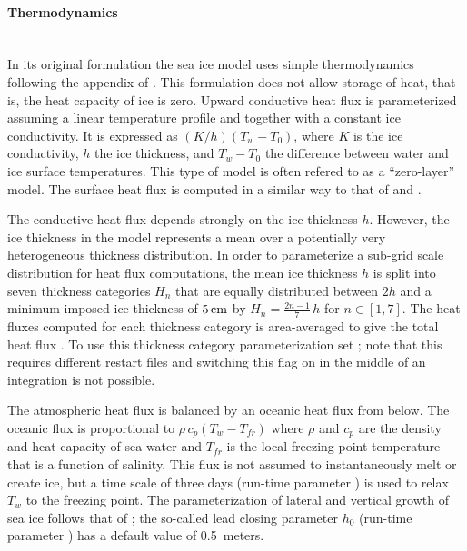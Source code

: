 \paragraph{Thermodynamics\label{sec:pkg:seaice:thermodynamics}}~\\
%
In its original formulation the sea ice model \citep{menemenlis05}
uses simple thermodynamics following the appendix of
\citet{sem76}. This formulation does not allow storage of heat,
that is, the heat capacity of ice is zero. Upward conductive heat flux
is parameterized assuming a linear temperature profile and together
with a constant ice conductivity. It is expressed as
$(K/h)(T_{w}-T_{0})$, where $K$ is the ice conductivity, $h$ the ice
thickness, and $T_{w}-T_{0}$ the difference between water and ice
surface temperatures. This type of model is often refered to as a
``zero-layer'' model. The surface heat flux is computed in a similar
way to that of \citet{parkinson79} and \citet{manabe79}. 

The conductive heat flux depends strongly on the ice thickness $h$.
However, the ice thickness in the model represents a mean over a
potentially very heterogeneous thickness distribution.  In order to
parameterize a sub-grid scale distribution for heat flux
computations, the mean ice thickness $h$ is split into seven thickness
categories $H_{n}$ that are equally distributed between $2h$ and a
minimum imposed ice thickness of $5\text{\,cm}$ by $H_n=
\frac{2n-1}{7}\,h$ for $n\in[1,7]$. The heat fluxes computed for each
thickness category is area-averaged to give the total heat flux
\citep{hibler84}. To use this thickness category parameterization set
; note that this requires
different restart files and switching this flag on in the middle of an
integration is not possible.

The atmospheric heat flux is balanced by an oceanic heat flux from
below.  The oceanic flux is proportional to
$\rho\,c_{p}\left(T_{w}-T_{fr}\right)$ where $\rho$ and $c_{p}$ are
the density and heat capacity of sea water and $T_{fr}$ is the local
freezing point temperature that is a function of salinity. This flux
is not assumed to instantaneously melt or create ice, but a time scale
of three days (run-time parameter ) is used
to relax $T_{w}$ to the freezing point.
%
The parameterization of lateral and vertical growth of sea ice follows
that of \citet{hib79, hib80}; the so-called lead closing parameter
$h_{0}$ (run-time parameter ) has a default value of
0.5~meters.

